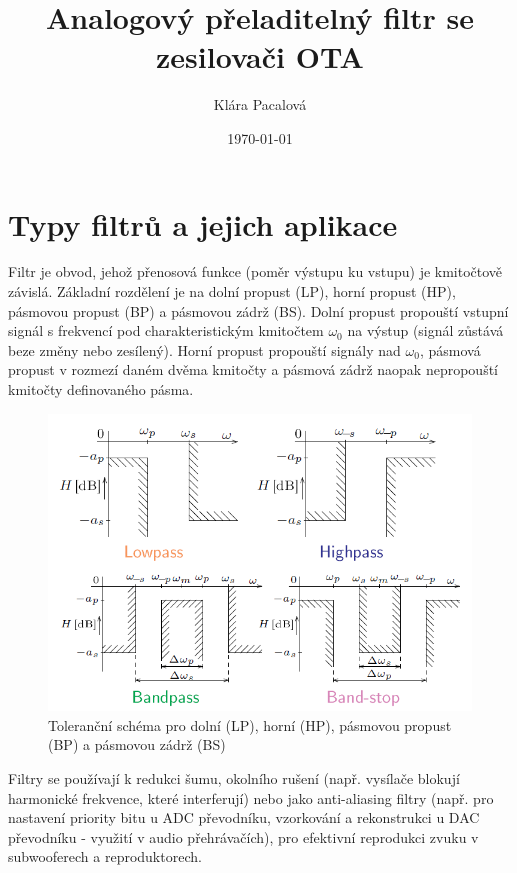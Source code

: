 \documentclass[twoside]{article}
\title{Analogový přeladitelný filtr se zesilovači OTA}
\author{Klára Pacalová}
\date{\today}
\begin{document}
\maketitle

\section{Typy filtrů a jejich aplikace}
Filtr je obvod, jehož přenosová funkce (poměr výstupu ku vstupu) je kmitočtově závislá. Základní rozdělení je na dolní propust (LP), horní propust (HP), pásmovou propust (BP) a pásmovou zádrž (BS). Dolní propust propouští vstupní signál s frekvencí pod charakteristickým kmitočtem $\omega _0$ na výstup (signál zůstává beze změny nebo zesílený). Horní propust propouští signály nad $\omega _0$, pásmová propust v rozmezí daném dvěma kmitočty a pásmová zádrž naopak nepropouští kmitočty definovaného pásma.
\begin{figure}[H]
\centering
\includegraphics[scale=0.6]{image9.png}
\caption{Toleranční schéma pro dolní (LP), horní (HP), pásmovou propust (BP) a pásmovou zádrž (BS)\cite{1}}
\end{figure}
\noindent Filtry se používají k redukci šumu, okolního rušení (např. vysílače blokují harmonické frekvence, které interferují) nebo jako anti-aliasing filtry (např. pro nastavení priority bitu u ADC převodníku, vzorkování a rekonstrukci u DAC převodníku - využití v audio přehrávačích), pro efektivní reprodukci zvuku v subwooferech a reproduktorech.
\end{document}
